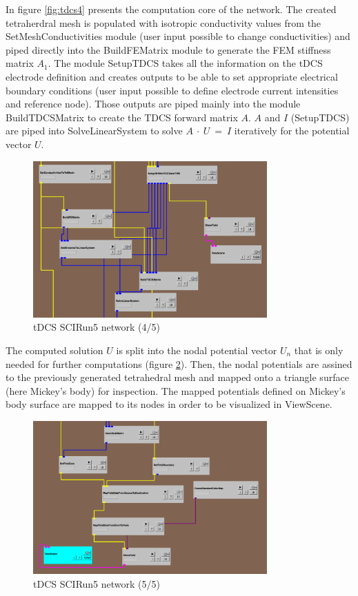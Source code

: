 \documentclass[fleqn,11pt,openany]{book}
\begin{document}
In figure \ref{fig:tdcs4} presents the computation core of the network. The created tetraherdral mesh is populated with
isotropic conductivity values from the SetMeshConductivities module (user input possible to change conductivities) and piped directly into the BuildFEMatrix module
to generate the FEM stiffness matrix $A_{1}$. The module SetupTDCS takes all the information on the tDCS electrode definition and creates
outputs to be able to set appropriate electrical boundary conditions (user input possible to define electrode current intensities and reference node).
Those outputs are piped mainly into the module BuildTDCSMatrix to create the TDCS forward matrix $A$. $A$ and $I$ (SetupTDCS) are piped into SolveLinearSystem
to solve $A\ \cdot\ U\ =\ I$ iteratively for the potential vector $U$.

\begin{figure}[!h]
\centering
\includegraphics[width=0.8\textwidth]{BrainStimulation_figures/tdcs_4.png}
\caption{ tDCS SCIRun5 network (4/5)}
\label{fig:tdcs2}
\end{figure}


The computed solution $U$ is split into the nodal potential vector $U_n$ that is only needed for further computations (figure \ref{fig:tdcs5}).
Then, the nodal potentials are assined to the previously generated tetrahedral mesh and mapped onto a triangle surface (here Mickey's body) for inspection.
The mapped potentials defined on Mickey's body surface are mapped to its nodes in order to be visualized in ViewScene.

 \begin{figure}[!h]
\centering
\includegraphics[width=0.8\textwidth]{BrainStimulation_figures/tdcs_5.png}
\caption{ tDCS SCIRun5 network (5/5)}
\label{fig:tdcs5}
\end{figure}
\end{document}
